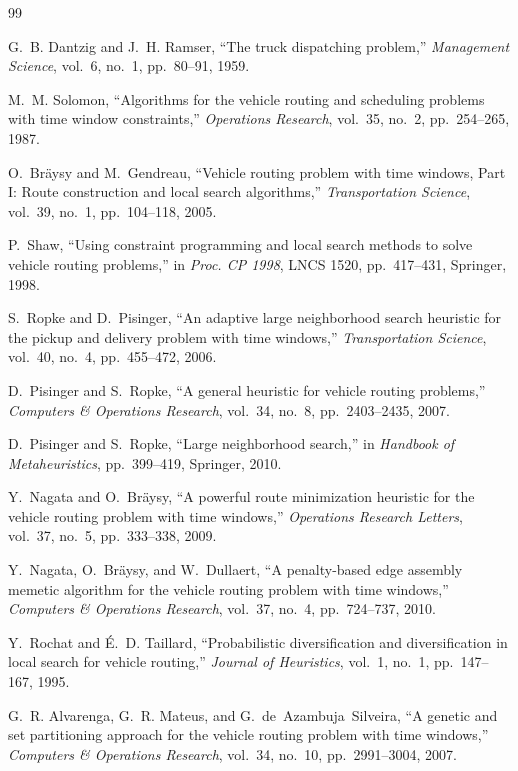 \begin{thebibliography}{99}

G.~B. Dantzig and J.~H. Ramser,
``The truck dispatching problem,''
\textit{Management Science}, vol.~6, no.~1, pp.~80--91, 1959.

M.~M. Solomon,
``Algorithms for the vehicle routing and scheduling problems with time window constraints,''
\textit{Operations Research}, vol.~35, no.~2, pp.~254--265, 1987.

O.~Br{\"a}ysy and M.~Gendreau,
``Vehicle routing problem with time windows, Part I: Route construction and local search algorithms,''
\textit{Transportation Science}, vol.~39, no.~1, pp.~104--118, 2005.

P.~Shaw,
``Using constraint programming and local search methods to solve vehicle routing problems,''
in \textit{Proc. CP 1998}, LNCS 1520, pp.~417--431, Springer, 1998.

S.~Ropke and D.~Pisinger,
``An adaptive large neighborhood search heuristic for the pickup and delivery problem with time windows,''
\textit{Transportation Science}, vol.~40, no.~4, pp.~455--472, 2006.

D.~Pisinger and S.~Ropke,
``A general heuristic for vehicle routing problems,''
\textit{Computers \& Operations Research}, vol.~34, no.~8, pp.~2403--2435, 2007.

D.~Pisinger and S.~Ropke,
``Large neighborhood search,''
in \textit{Handbook of Metaheuristics}, pp.~399--419, Springer, 2010.

Y.~Nagata and O.~Br\"aysy,
``A powerful route minimization heuristic for the vehicle routing problem with time windows,''
\textit{Operations Research Letters}, vol.~37, no.~5, pp.~333--338, 2009.

Y.~Nagata, O.~Br\"aysy, and W.~Dullaert,
``A penalty-based edge assembly memetic algorithm for the vehicle routing problem with time windows,''
\textit{Computers \& Operations Research}, vol.~37, no.~4, pp.~724--737, 2010.

Y.~Rochat and {\'E}.~D. Taillard,
``Probabilistic diversification and diversification in local search for vehicle routing,''
\textit{Journal of Heuristics}, vol.~1, no.~1, pp.~147--167, 1995.

G.~R. Alvarenga, G.~R. Mateus, and G.~de~Azambuja~Silveira,
``A genetic and set partitioning approach for the vehicle routing problem with time windows,''
\textit{Computers \& Operations Research}, vol.~34, no.~10, pp.~2991--3004, 2007.


\end{thebibliography}
